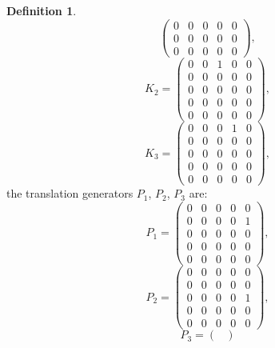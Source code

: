 \documentclass{amsart}
\theoremstyle{definition}
\newtheorem{definition}{Definition}[theorem]
\theoremstyle{remark}
\begin{document}
\begin{definition}
\begin{equation*}
\begin{pmatrix}
      0 & 0 & 0 & 0 & 0 \\
      0 & 0 & 0 & 0 & 0 \\
      0 & 0 & 0 & 0 & 0
    \end{pmatrix},
  \end{equation*}
  \begin{equation*}
    K_2 =
    \begin{pmatrix}
      0 & 0 & 1 & 0 & 0 \\
      0 & 0 & 0 & 0 & 0 \\
      0 & 0 & 0 & 0 & 0 \\
      0 & 0 & 0 & 0 & 0 \\
      0 & 0 & 0 & 0 & 0
    \end{pmatrix},
  \end{equation*}
  \begin{equation*}
    K_3 =
    \begin{pmatrix}
      0 & 0 & 0 & 1 & 0 \\
      0 & 0 & 0 & 0 & 0 \\
      0 & 0 & 0 & 0 & 0 \\
      0 & 0 & 0 & 0 & 0 \\
      0 & 0 & 0 & 0 & 0
    \end{pmatrix},
  \end{equation*}
  the translation generators $P_1$, $P_2$, $P_3$ are:
  \begin{equation*}
    P_1 =
    \begin{pmatrix}
      0 & 0 & 0 & 0 & 0 \\
      0 & 0 & 0 & 0 & 1 \\
      0 & 0 & 0 & 0 & 0 \\
      0 & 0 & 0 & 0 & 0 \\
      0 & 0 & 0 & 0 & 0
    \end{pmatrix},
  \end{equation*}
  \begin{equation*}
    P_2 =
    \begin{pmatrix}
      0 & 0 & 0 & 0 & 0 \\
      0 & 0 & 0 & 0 & 0 \\
      0 & 0 & 0 & 0 & 1 \\
      0 & 0 & 0 & 0 & 0 \\
      0 & 0 & 0 & 0 & 0
    \end{pmatrix},
  \end{equation*}
  \begin{equation*}
    P_3 =
    \begin{pmatrix}

\end{pmatrix}
\end{equation*}
\end{definition}
\end{document}
